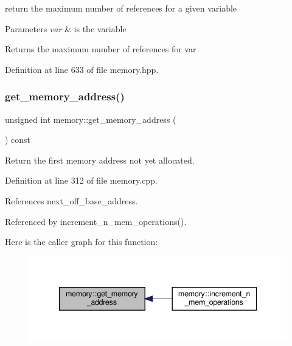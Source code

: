 return the maximum number of references for a given variable 


\begin{DoxyParams}{Parameters}
{\em var} & is the variable \\
\hline
\end{DoxyParams}
\begin{DoxyReturn}{Returns}
the maximum number of references for var 
\end{DoxyReturn}


Definition at line 633 of file memory.\+hpp.

\mbox{\label{classmemory_a510234387e466e099cffb7a6a01ed92f}} 
\subsubsection{\texorpdfstring{get\+\_\+memory\+\_\+address()}{get\_memory\_address()}}
{\footnotesize\ttfamily unsigned int memory\+::get\+\_\+memory\+\_\+address (\begin{DoxyParamCaption}{ }\end{DoxyParamCaption}) const}



Return the first memory address not yet allocated. 



Definition at line 312 of file memory.\+cpp.



References next\+\_\+off\+\_\+base\+\_\+address.



Referenced by increment\+\_\+n\+\_\+mem\+\_\+operations().

Here is the caller graph for this function\+:
\nopagebreak
\begin{figure}[H]
\begin{center}
\leavevmode
\includegraphics[width=339pt]{d8/d99/classmemory_a510234387e466e099cffb7a6a01ed92f_icgraph}
\end{center}
\end{figure}
\mbox{\label{classmemory_a94c1ee081f754ed454af2fc6729072d0}} 
